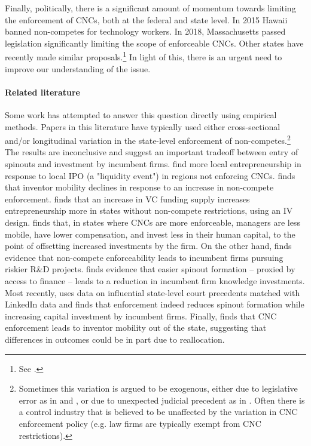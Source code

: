 \documentclass[12pt,english]{article}
\theoremstyle{remark}
\begin{document}
Finally, politically, there is a significant amount of momentum towards limiting the enforcement of CNCs, both at the federal and state level. In 2015 Hawaii banned non-competes for technology workers. In 2018, Massachusetts passed legislation significantly limiting the scope of enforceable CNCs. Other states have recently made similar proposals.\footnote{See \cite{the_white_house_technical_report_non-compete_2016}.} In light of this, there is an urgent need to improve our understanding of the issue. 

\paragraph{Related literature}

Some work has attempted to answer this question directly using empirical methods. Papers in this literature have typically used either cross-sectional and/or longitudinal variation in the state-level enforcement of non-competes.\footnote{Sometimes this variation is argued to be exogenous, either due to legislative error as in \cite{marx_mobility_2009} and \cite{marx_regional_2015}, or due to unexpected judicial precedent as in \cite{jeffers_impact_2018}. Often there is a control industry that is believed to be unaffected by the variation in CNC enforcement policy (e.g. law firms are typically exempt from CNC restrictions).} The results are inconclusive and suggest an important tradeoff between entry of spinouts and investment by incumbent firms. \cite{stuart_liquidity_2003} find more local  entrepreneurship in response to local IPO (a "liquidity event") in regions not enforcing CNCs. \cite{marx_mobility_2009} finds that inventor mobility declines in response to an increase in non-compete enforcement. \cite{samila_venture_2010} finds that an increase in VC funding supply increases entrepreneurship more in states without non-compete restrictions, using an IV design. \cite{garmaise_ties_2011} finds that, in states where CNCs are more enforceable, managers are less mobile, have lower compensation, and invest less in their human capital, to the point of offsetting increased investments by the firm. On the other hand, \cite{conti_non-competition_2014} finds evidence that non-compete enforceability leads to incumbent firms pursuing riskier R\&D projects. \cite{colombo_does_2013} finds evidence that easier spinout formation -- proxied by access to finance -- leads to a reduction in incumbent firm knowledge investments.  Most recently, \cite{jeffers_impact_2018} uses data on influential state-level court precedents matched with LinkedIn data and finds that enforcement indeed reduces spinout formation while increasing capital investment by incumbent firms. Finally, \cite{marx_regional_2015} finds that CNC enforcement leads to inventor mobility out of the state, suggesting that differences in outcomes could be in part due to reallocation. 
\end{document}
